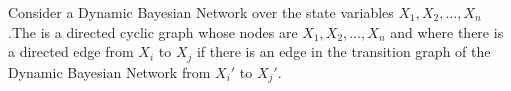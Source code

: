 \begin{defi}
Consider a Dynamic Bayesian Network over the state variables $X_1,X_2,\ldots,X_n$ .The  is a directed cyclic graph whose nodes are $X_1,X_2,\ldots,X_n$ and where there is a directed edge from $X_i$ to $X_j$ if there is an edge in the transition graph of the Dynamic Bayesian Network from $X_i'$ to $X_j'$.
\cite{conf/ijcai/KearnsK99}
\end{defi}